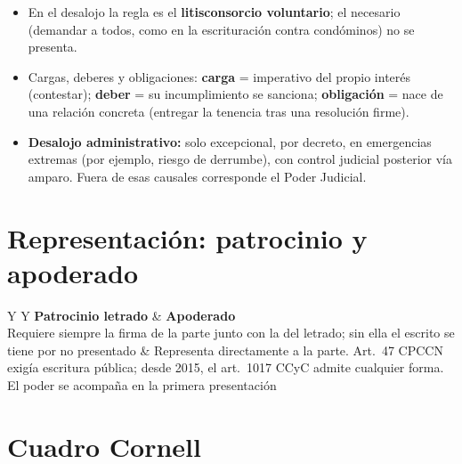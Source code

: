 \begin{itemize}
  \item En el desalojo la regla es el \textbf{litisconsorcio voluntario}; el necesario (demandar a todos, como en la escrituración contra condóminos) no se presenta.
  \item Cargas, deberes y obligaciones: \textbf{carga} = imperativo del propio interés (contestar); \textbf{deber} = su incumplimiento se sanciona; \textbf{obligación} = nace de una relación concreta (entregar la tenencia tras una resolución firme).
  \item \textbf{Desalojo administrativo:} solo excepcional, por decreto, en emergencias extremas (por ejemplo, riesgo de derrumbe), con control judicial posterior vía amparo. Fuera de esas causales corresponde el Poder Judicial.
\end{itemize}

\section{Representación: patrocinio y apoderado}

\begin{center}
\begin{tabularx}{\textwidth}{Y Y}
\toprule
\textbf{Patrocinio letrado} & \textbf{Apoderado} \\
\midrule
Requiere siempre la firma de la parte junto con la del letrado; sin ella el escrito se tiene por no presentado & Representa directamente a la parte. Art.\ 47 CPCCN exigía escritura pública; desde 2015, el art.\ 1017 CCyC admite cualquier forma. El poder se acompaña en la primera presentación \\
\bottomrule
\end{tabularx}
\end{center}

\section{Cuadro Cornell}

